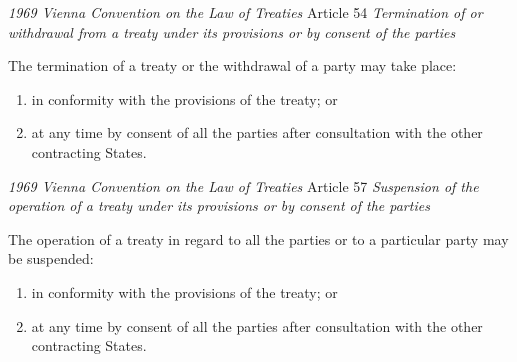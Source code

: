 \begin{conventiondetails}{\textit{1969 Vienna Convention on the Law of Treaties} Article 54}
    \flushleft
    \textit{Termination of or withdrawal from a treaty under its provisions or by consent of the parties }

    \vspace{\baselineskip}

    The termination of a treaty or the withdrawal of a party may take place:
    \begin{enumerate}[label=(\alph*)]
        \item in conformity with the provisions of the treaty; or 
        \item at any time by consent of all the parties after consultation with the other contracting States.
    \end{enumerate}
\end{conventiondetails}

\begin{conventiondetails}{\textit{1969 Vienna Convention on the Law of Treaties} Article 57}
    \flushleft
    \textit{Suspension of the operation of a treaty under its provisions or by consent of the parties }

    \vspace{\baselineskip}

    The operation of a treaty in regard to all the parties or to a particular party may be suspended:
    \begin{enumerate}[label=(\alph*)]
        \item in conformity with the provisions of the treaty; or
        \item at any time by consent of all the parties after consultation with the other contracting States.
    \end{enumerate}
\end{conventiondetails}

